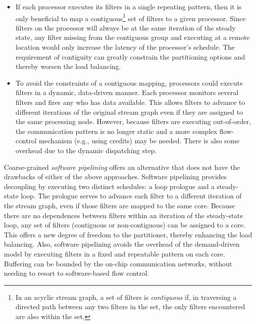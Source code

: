 \begin{itemize}

\item If each processor executes its filters in a single repeating
pattern, then it is only beneficial to map a contiguous\footnote{In an
acyclic stream graph, a set of filters is {\it contiguous} if, in
traversing a directed path between any two filters in the set, the
only filters encountered are also within the set.} set of filters to a
given processor.  Since filters on the processor will always be at the
same iteration of the steady state, any filter missing from the
contiguous group and executing at a remote location would only
increase the latency of the processor's schedule.  The requirement of
contiguity can greatly constrain the partitioning options and thereby
worsen the load balancing.

\item To avoid the constraints of a contiguous mapping, processors
could execute filters in a dynamic, data-driven manner.  Each
processor monitors several filters and fires any who has data
available.  This allows filters to advance to different iterations of
the original stream graph even if they are assigned to the same
processing node.  However, because filters are executing out-of-order,
the communication pattern is no longer static and a more complex
flow-control mechanism (e.g., using credits) may be needed.  There is
also some overhead due to the dynamic dispatching step.

\end{itemize}

Coarse-grained {\it software pipelining} offers an alternative that
does not have the drawbacks of either of the above approaches.
Software pipelining provides decoupling by executing two distinct
schedules: a loop prologue and a steady-state loop.  The prologue
serves to advance each filter to a different iteration of the stream
graph, even if those filters are mapped to the same core.  Because
there are no dependences between filters within an iteration of the
steady-state loop, any set of filters (contiguous or non-contiguous)
can be assigned to a core.  This offers a new degree of freedom to the
partitioner, thereby enhancing the load balancing.  Also, software
pipelining avoids the overhead of the demand-driven model by executing
filters in a fixed and repeatable pattern on each core.  Buffering can
be bounded by the on-chip communication networks, without needing to
resort to software-based flow control.


